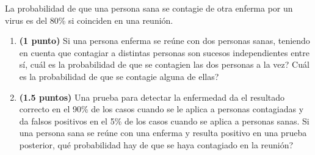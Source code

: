 
La probabilidad de que una persona sana se contagie de otra enferma por un
virus es del 80\% si coinciden en una reunión.
\begin{enumerate}[label=\alph*)]
  \item \textbf{(1 punto)} Si una persona enferma se reúne con dos personas
  sanas, teniendo en cuenta que contagiar a distintas personas son sucesos
  independientes entre sí, \textquestiondown{}cuál es la probabilidad de que
  se contagien las dos personas a la vez? \textquestiondown{}Cuál es la
  probabilidad de que se contagie alguna de ellas?
  \item \textbf{(1.5 puntos)} Una prueba para detectar la enfermedad da el
  resultado correcto en el 90\% de los casos cuando se le aplica a personas
  contagiadas y da falsos positivos en el 5\% de los casos cuando se aplica
  a personas sanas. Si una persona sana se reúne con una enferma y resulta
  positivo en una prueba posterior, \textquestiondown{}qué probabilidad hay
  de que se haya contagiado en la reunión?
\end{enumerate}
